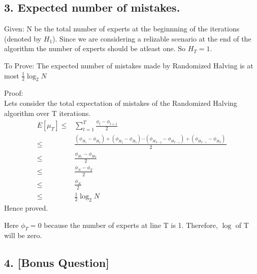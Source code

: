 \documentclass{article}
\begin{document}
\subsection*{3. Expected number of mistakes.}
\begin{description}
  \item{Given:} N be the total number of experts at the beginnning of the iterations (denoted by \( H_{1} \)). Since we are considering a relizable scenario at the end of the algorithm the number of experts should be atleast one.  So \( H_{T} = 1 \). 
  \item{To Prove:} The expected number of mistakes made by Randomized Halving is at most \( \frac{1}{2}\log_2{N} \)
  \item{Proof:} \\
    Lets consider the total expectation of mistakes of the Randomized Halving algorithm over T iterations.
    \begin{align*}
      E[\mu_{T}] \le & \sum_{t=1}^{T} \frac{\phi_{t} - \phi_{t+1}}{2} \\
      \le & \frac{(\phi_{H_{1}} - \phi_{H_{2}}) + (\phi_{H_{2}} - \phi_{H_{3}})  \cdots (\phi_{H_{T-2}} - \phi_{H_{T-1}}) + (\phi_{H_{T-1}} - \phi_{H_{T}}) \ }{2} \\
      \le & \frac{\phi_{H_{1}} - \phi_{H_{T}}}{2} \\
      \le & \frac{\phi_{N} - \phi_{T}}{2} \\
      \le & \frac{\phi_{N}}{2} \\
      \le & \frac{1}{2}\log_2{N}
    \end{align*}
    Hence proved.

    Here \( \phi_{T} = 0 \) because the number of experts at line T is 1.  Therefore, \( \log \) of T will be zero.
\end{description}

\subsection*{4. [Bonus Question]}
\end{document}
